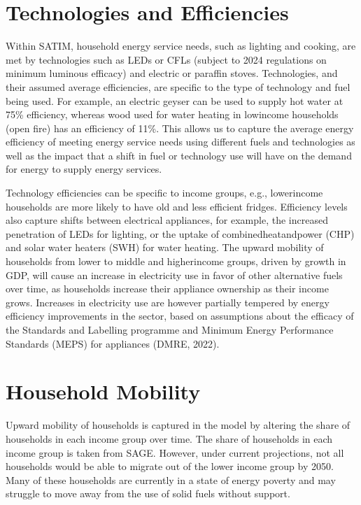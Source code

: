 \documentclass[letterpaper,10pt,english]{jupyterBook}
\begin{document}
\section{Technologies and Efficiencies}
\label{\detokenize{08Residential:technologies-and-efficiencies}}
\sphinxAtStartPar
Within SATIM, household energy service needs, such as lighting and cooking, are met by technologies such as LEDs or CFLs (subject to 2024 regulations on minimum luminous efficacy) and electric or paraffin stoves. Technologies, and their assumed average efficiencies, are specific to the type of technology and fuel being used. For example, an electric geyser can be used to supply hot water at 75\% efficiency, whereas wood used for water heating in low\sphinxhyphen{}income households (open fire) has an efficiency of 11\%. This allows us to capture the average energy efficiency of meeting energy service needs using different fuels and technologies as well as the impact that a shift in fuel or technology use will have on the demand for energy to supply energy services.

\sphinxAtStartPar
Technology efficiencies can be specific to income groups, e.g., lower\sphinxhyphen{}income households are more likely to have old and less efficient fridges. Efficiency levels also capture shifts between electrical appliances, for example, the increased penetration of LEDs for lighting, or the uptake of combined\sphinxhyphen{}heat\sphinxhyphen{}and\sphinxhyphen{}power (CHP) and solar water heaters (SWH) for water heating. The upward mobility of households from lower to middle\sphinxhyphen{} and higher\sphinxhyphen{}income groups, driven by growth in GDP, will cause an increase in electricity use in favor of other alternative fuels over time, as households increase their appliance ownership as their income grows. Increases in electricity use are however partially tempered by energy efficiency improvements in the sector, based on assumptions about the efficacy of the Standards and Labelling programme and Minimum Energy Performance Standards (MEPS) for appliances (DMRE, 2022).


\section{Household Mobility}
\label{\detokenize{08Residential:household-mobility}}
\sphinxAtStartPar
Upward mobility of households is captured in the model by altering the share of households in each income group over time. The share of households in each income group is taken from SAGE. However, under current projections, not all households would be able to migrate out of the lower income group by 2050. Many of these households are currently in a state of energy poverty and may struggle to move away from the use of solid fuels without support.
\end{document}

